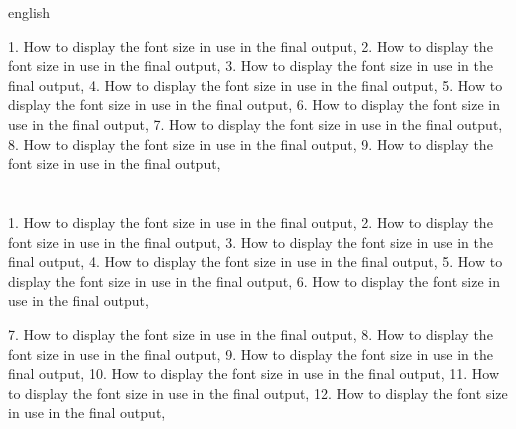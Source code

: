 \begin{otherlanguage*}{english}

    \showfont

    1. How to display the font size in use in the final output,
    2. How to display the font size in use in the final output,
    3. How to display the font size in use in the final output,
    4. How to display the font size in use in the final output,
    5. How to display the font size in use in the final output,
    6. How to display the font size in use in the final output,
    7. How to display the font size in use in the final output,
    8. How to display the font size in use in the final output,
    9. How to display the font size in use in the final output,


    \newpage



    \section[Some encoding tests]{\showfont}

    1. How to display the font size in use in the final output,
    2. How to display the font size in use in the final output,
    3. How to display the font size in use in the final output,
    4. How to display the font size in use in the final output,
    5. How to display the font size in use in the final output,
    6. How to display the font size in use in the final output,

    7. How to display the font size in use in the final output,
    8. How to display the font size in use in the final output,
    9. How to display the font size in use in the final output,
    10. How to display the font size in use in the final output,
    11. How to display the font size in use in the final output,
    12. How to display the font size in use in the final output,

    \subsection{\showfont}


\end{otherlanguage*}
